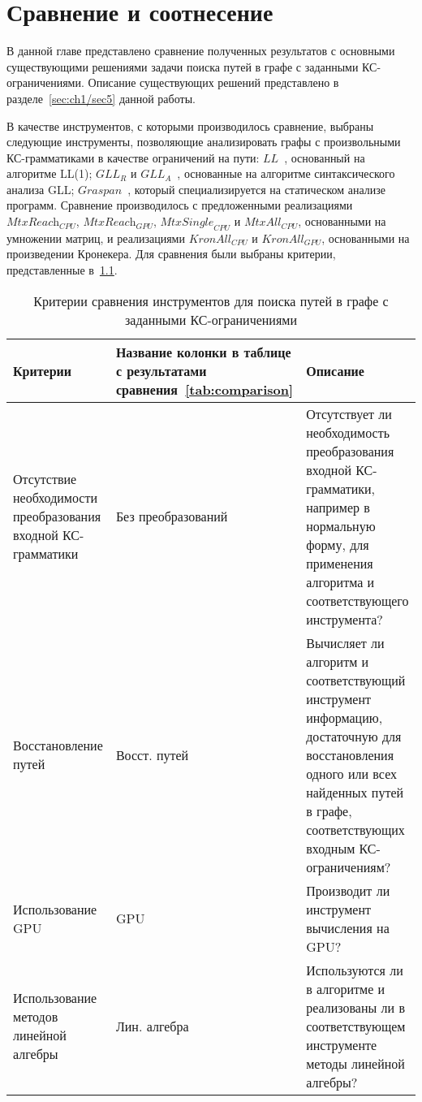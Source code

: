 \chapter{Сравнение и соотнесение}\label{ch:ch6}
В данной главе представлено сравнение полученных результатов с основными существующими решениями задачи поиска путей в графе с заданными КС-ограничениями. Описание существующих решений представлено в разделе~\ref{sec:ch1/sec5} данной работы.

В качестве инструментов, с которыми производилось сравнение, выбраны следующие инструменты, позволяющие анализировать графы с произвольными КС-грамматиками в качестве ограничений на пути: $\textit{LL}$~\cite{medeiros2018efficient}, основанный на алгоритме LL(1); $\textit{GLL}_{\textit{R}}$ и $\textit{GLL}_{\textit{A}}$~\cite{grigorev2017context}, основанные на алгоритме синтаксического анализа GLL; $\textit{Graspan}$~\cite{graspan}, который специализируется на статическом анализе программ. Сравнение производилось с предложенными реализациями $\textit{MtxReach}_{\textit{CPU}}$, $\textit{MtxReach}_{\textit{GPU}}$, $\textit{MtxSingle}_{\textit{CPU}}$ и $\textit{MtxAll}_{\textit{CPU}}$, основанными на умножении матриц, и реализациями $\textit{KronAll}_{\textit{CPU}}$ и $\textit{KronAll}_{\textit{GPU}}$, основанными на произведении Кронекера. Для сравнения были выбраны критерии, представленные в~\cref{tab:compCriteria}. 

\begin{table} [h]
  \centering
   \begin{threeparttable}%
  \caption{Критерии сравнения инструментов для поиска путей в графе с заданными КС-ограничениями}\label{tab:compCriteria}
  \begin{tabular}{| p{4.5cm} | p{3cm} | p{8cm} |}
  \hline                               
  \hline
  Критерии & Название колонки в таблице с результатами сравнения~\ref{tab:comparison} & Описание \\
  \hline
  Отсутствие необходимости преобразования входной КС-грамматики & Без преобразований & Отсутствует ли необходимость преобразования входной КС-грамматики, например в нормальную форму, для применения алгоритма и соответствующего инструмента?\\
  Восстановление путей  & Восст. путей  & Вычисляет ли алгоритм и соответствующий инструмент информацию, достаточную для восстановления одного или всех найденных путей в графе, соответствующих входным КС-ограничениям?\\
  Использование GPU & GPU & Производит ли инструмент вычисления на GPU?\\
  Использование методов линейной алгебры     & Лин. алгебра & Используются ли в алгоритме и реализованы ли в соответствующем инструменте методы линейной алгебры?\\
  \hline
  \hline
  \end{tabular}
  \end{threeparttable}
\end{table}

